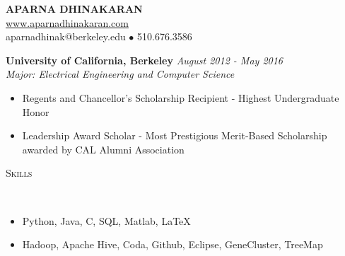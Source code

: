 \documentclass[9pt]{extarticle}
\newenvironment{changemargin}[2]{%
  \begin{list}{}{%
    \setlength{\topsep}{0pt}%
    \setlength{\leftmargin}{#1}%
    \setlength{\rightmargin}{#2}%
    \setlength{\listparindent}{\parindent}%
    \setlength{\itemindent}{\parindent}%
    \setlength{\parsep}{\parskip}%
  }%
  \item[]}{\end{list}
}
\newcommand{\lineover}{
	\begin{changemargin}{-0.05in}{-0.05in}
		\vspace*{-8pt}
		\hrulefill \\
		\vspace*{-2pt}
	\end{changemargin}
}
\newcommand{\header}[1]{
    \vspace{5pt}
	\begin{changemargin}{-0.5in}{-0.5in}
		\scshape{#1}\\
  	\lineover
	\end{changemargin}
	\vspace{5pt}
}
\newenvironment{body} {
	\vspace*{-9pt}
	\begin{changemargin}{-0.5in}{-0.5in}
  }	
	{\end{changemargin}
}
\newcommand{\name}[5]{
	\begin{changemargin}{-0.5in}{-0.5in}
		\begin{center}
			{\Huge \scshape {\textbf{#1}}}\\ \smallskip
			{\url{#2}}\\ \smallskip 
			{#3}\\ \smallskip
		\end{center}
	\end{changemargin}
}
\begin{document}

\name{APARNA DHINAKARAN}{www.aparnadhinakaran.com}{aparnadhinak@berkeley.edu $\bullet$ 510.676.3586}


\header{Education}
\begin{body}
	\textbf{University of California, Berkeley} \hfill \emph{August 2012 - May 2016}{} \\
	\emph{Major: Electrical Engineering and Computer Science}
	\vspace{-2pt} 
	\begin{itemize}
	\itemsep -2pt
		\item[] Regents and Chancellor's Scholarship Recipient - Highest Undergraduate Honor 
		\item[] Leadership Award Scholar - Most Prestigious Merit-Based Scholarship awarded by CAL Alumni Association
		\end{itemize}
\end{body}

%
%
%
\vspace*{-2pt}
\header{Skills}

\begin{body}
	\begin{itemize}
    \itemsep -2pt
	\item[] Python, Java, C, SQL, Matlab, \LaTeX
	\item[] Hadoop, Apache Hive, Coda, Github, Eclipse, GeneCluster, TreeMap
	\end{itemize}
\end{body}
\end{document}
